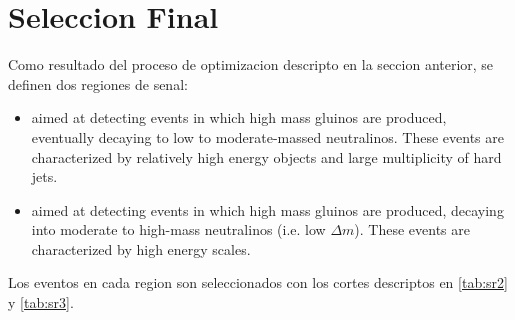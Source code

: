 

\section{Seleccion Final}\label{sec:signal_regions}

Como resultado del proceso de optimizacion descripto en la seccion anterior,
se definen dos regiones de senal:

\begin{itemize}\itemsep0.1cm
\item[{\bf {\SRL}}] aimed at detecting events in which high mass gluinos are produced, eventually decaying to low to moderate-massed neutralinos. These events are characterized by relatively high energy objects and large multiplicity of hard jets.
\item[{\bf {\SRH}}] aimed at detecting events in which high mass gluinos are produced, decaying into moderate to high-mass neutralinos (i.e. low $\Delta m$). These events are characterized by high energy scales.
\end{itemize}

Los eventos en cada region son seleccionados con los cortes descriptos en
{\tab} \ref{tab:sr2} y {\tab} \ref{tab:sr3}.

